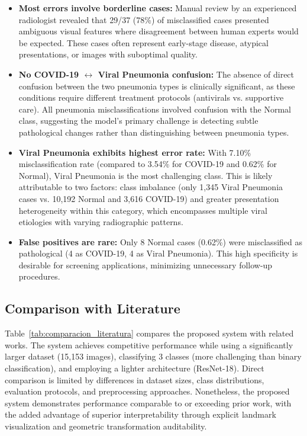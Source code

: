 \documentclass[applsci,article,submit,pdftex,moreauthors]{Definitions/mdpi}
\begin{document}
\begin{itemize}
\item \textbf{Most errors involve borderline cases:} Manual review by an experienced radiologist revealed that 29/37 (78\%) of misclassified cases presented ambiguous visual features where disagreement between human experts would be expected. These cases often represent early-stage disease, atypical presentations, or images with suboptimal quality.

\item \textbf{No COVID-19 $\leftrightarrow$ Viral Pneumonia confusion:} The absence of direct confusion between the two pneumonia types is clinically significant, as these conditions require different treatment protocols (antivirals vs. supportive care). All pneumonia misclassifications involved confusion with the Normal class, suggesting the model's primary challenge is detecting subtle pathological changes rather than distinguishing between pneumonia types.

\item \textbf{Viral Pneumonia exhibits highest error rate:} With 7.10\% misclassification rate (compared to 3.54\% for COVID-19 and 0.62\% for Normal), Viral Pneumonia is the most challenging class. This is likely attributable to two factors: class imbalance (only 1,345 Viral Pneumonia cases vs. 10,192 Normal and 3,616 COVID-19) and greater presentation heterogeneity within this category, which encompasses multiple viral etiologies with varying radiographic patterns.

\item \textbf{False positives are rare:} Only 8 Normal cases (0.62\%) were misclassified as pathological (4 as COVID-19, 4 as Viral Pneumonia). This high specificity is desirable for screening applications, minimizing unnecessary follow-up procedures.
\end{itemize}

\subsection{Comparison with Literature}

Table~\ref{tab:comparacion_literatura} compares the proposed system with related works. The system achieves competitive performance while using a significantly larger dataset (15,153 images), classifying 3 classes (more challenging than binary classification), and employing a lighter architecture (ResNet-18). Direct comparison is limited by differences in dataset sizes, class distributions, evaluation protocols, and preprocessing approaches. Nonetheless, the proposed system demonstrates performance comparable to or exceeding prior work, with the added advantage of superior interpretability through explicit landmark visualization and geometric transformation auditability.
\end{document}
